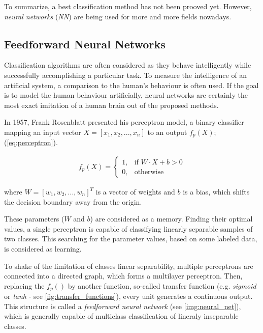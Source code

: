 To summarize, a best classification method has not been prooved yet. However, \textit{neural networks} (\textit{NN}) are being used for more and more fields nowadays.  

\subsection*{Feedforward Neural Networks} \label{ssec:intro_to_nn}
Classification algorithms are often considered as they behave intelligently while successfully accomplishing a particular task. To measure the intelligence of an artificial system, a comparison to the human's behaviour is often used. If the goal is to model the human behaviour artificially, neural networks are certainly the most exact imitation of a human brain out of the proposed methods.

In 1957, Frank Rosenblatt presented his perceptron model, a binary classifier mapping an input vector $ X = [x_1, x_2, ..., x_n] $ to an output $ f_p(X) $; (\cref{eq:perceptron}).

\begin{align} \label{eq:perceptron}
f_p(X) = 
\begin{cases}
    1, & \text{if }  W \cdot X + b > 0\\
    0,              & \text{otherwise}
\end{cases}
\end{align}

where $ W = [w_1, w_2, ..., w_n]^T $ is a vector of weights and $ b $ is a bias, which shifts the decision boundary away from the origin.

These parameters ($ W $ and $ b $) are considered as a memory. Finding their optimal values, a single perceptron is capable of classifying linearly separable samples of two classes. This searching for the parameter values, based on some labeled data, is considered as learning.

To shake of the limitation of classes linear separability, multiple perceptrons are connected into a directed graph, which forms a multilayer perceptron. Then, replacing the $ f_p() $ by another function, so-called transfer function (e.g. \textit{sigmoid} or \textit{tanh} - see \cref{fig:transfer_functions}), every unit generates a continuous output. This structure is called a \textit{feedforward neural network} (see \cref{img:neural_net}), which is generally capable of multiclass classification of lineraly inseparable classes.

